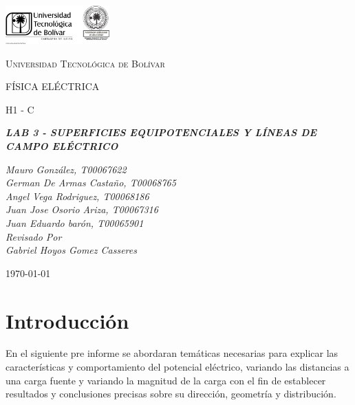\documentclass[letterpaper, 12pt]{report}
\begin{document}
\begin{titlepage}
	\centering
	\includegraphics[width=0.3\textwidth]{Images/logo_utb.png}\par\vspace{1cm}
	{\scshape\LARGE Universidad Tecnológica de Bolívar \par}
	\vspace{1cm}

	{\scshape\Large FÍSICA ELÉCTRICA \par}
	\vspace{.2cm}

	{\scshape\Large H1 - C \par}
	\vspace{1cm}
	\slshape {\Large \bfseries{} LAB 3 - SUPERFICIES EQUIPOTENCIALES Y LÍNEAS
		DE CAMPO ELÉCTRICO  \\}
	\vspace{1cm}

	\slshape {\itshape{} Mauro González, T00067622 \\}
	\slshape {\itshape{} German De Armas Castaño, T00068765 \\}
	\slshape {\itshape{} Angel Vega Rodriguez, T00068186 \\}
	\slshape {\itshape{} Juan Jose Osorio Ariza, T00067316 \\}
	\slshape {\itshape{} Juan Eduardo barón, T00065901 \\}
	\vfill
	Revisado Por \\
	Gabriel Hoyos Gomez Casseres\\
	{\large \today\par}
\end{titlepage}

\section{Introducción}

En el siguiente pre informe se abordaran temáticas necesarias para  explicar
las características y comportamiento del potencial eléctrico, variando las
distancias a una carga fuente y variando la magnitud de la carga con el fin
de establecer resultados y conclusiones precisas sobre su dirección, 
geometría y distribución.
\end{document}
